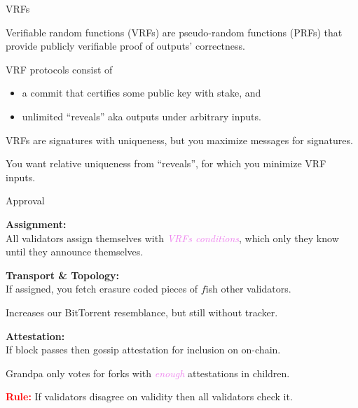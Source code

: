 \documentclass{beamer}
\begin{document}
\begin{frame}[t]{VRFs}

Verifiable random functions (VRFs) are pseudo-random functions (PRFs) that provide publicly verifiable proof of outputs' correctness.

\bigskip

VRF protocols consist of
\begin{itemize}
\item a commit that certifies some public key with stake, and
\item unlimited ``reveals'' aka outputs under arbitrary inputs.
\end{itemize}

\bigskip

VRFs are signatures with uniqueness, but you maximize messages for signatures. 

\medskip

You want relative uniqueness from ``reveals'', for which you minimize VRF inputs.

\end{frame}


\begin{frame}[t]{Approval}

{\bf Assignment:}  \\ \smallskip
All validators assign themselves with \textcolor{violet}{\em VRFs conditions}, which
only they know until they announce themselves.

\bigskip

{\bf Transport \& Topology:} \\ \smallskip
If assigned, you fetch erasure coded pieces of $f$ish other validators. \\ \smallskip

\hspace*{5pt} Increases our BitTorrent resemblance, but still without tracker.

\bigskip

{\bf Attestation:}  \\ \smallskip
If block passes then gossip attestation for inclusion on on-chain.

Grandpa only votes for forks with \textcolor{violet}{\em enough} attestations in children.

\bigskip\bigskip

\textcolor{red}{\bf Rule:}  If validators disagree on validity then all validators check it.

\end{frame}
\end{document}
